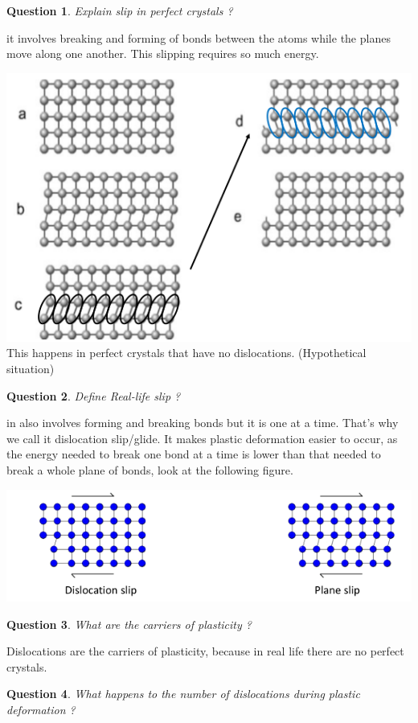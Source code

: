 \documentclass[13]{article}
\newtheorem{exer}{Question}
\begin{document}
\begin{exer}
Explain slip in perfect crystals ?
\end{exer}
it involves breaking and forming of bonds between the atoms while the planes move along one another. This slipping requires so much energy.
\begin{center}
\includegraphics[scale=0.5]{figures/12.png}
This happens in perfect crystals that have no dislocations. (Hypothetical situation)
\end{center}
\begin{exer}
Define Real-life slip ?
\end{exer}
in also involves forming and breaking bonds but it is one at a time. That's why we call it dislocation slip/glide. It makes plastic deformation easier to occur, as the energy needed to break one bond at a time is lower than that needed to break a whole plane of bonds, look at the following figure. 
\begin{center}
\includegraphics[scale=0.5]{figures/13.png}
\end{center}
\begin{exer}
What are the carriers of plasticity ?
\end{exer}
Dislocations are the carriers of plasticity, because in real life there are no perfect crystals.
\begin{exer}
What happens to the number of dislocations during plastic deformation ?
\end{exer}
\end{document}
